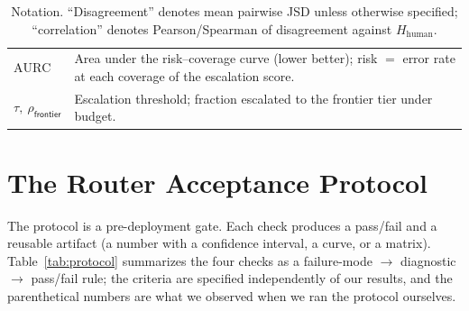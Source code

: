 \documentclass[letterpaper]{article} %
\begin{document}
\begin{table}[t]
\begin{tabular}{lp{}}
$\mathrm{AURC}$ & Area under the risk--coverage curve (lower better); risk $=$ error rate at each coverage of the escalation score. \\
$\tau,\ \rho_{\textsf{frontier}}$ & Escalation threshold; fraction escalated to the frontier tier under budget. \\
\bottomrule
\end{tabular}
\caption{Notation. ``Disagreement'' denotes mean pairwise JSD unless otherwise
specified; ``correlation'' denotes Pearson/Spearman of disagreement against
$H_{\text{human}}$.}
\label{tab:notation}
\end{table}

\section{The Router Acceptance Protocol}
The protocol is a pre-deployment gate. Each check produces a pass/fail and a
reusable artifact (a number with a confidence interval, a curve, or a matrix).
Table~\ref{tab:protocol} summarizes the four checks as a failure-mode $\to$
diagnostic $\to$ pass/fail rule; the criteria are specified independently of our
results, and the parenthetical numbers are what we observed when we ran the
protocol ourselves.
\end{document}
